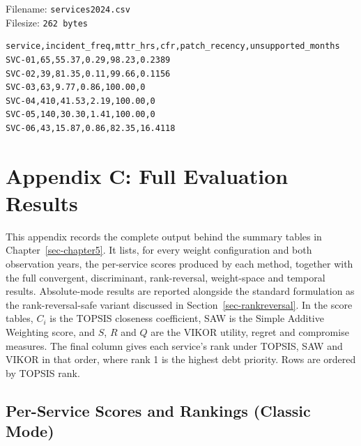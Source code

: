 \documentclass[
  12pt,
  letterpaper,
  12pt,
  oneside,
  english,
  onehalfspacing,
  headsepline]{MastersDoctoralThesis}
\begin{document}
\vspace{1cm}

Filename: \texttt{services2024.csv}\\
Filesize: \texttt{262\ bytes}

\begin{verbatim}
service,incident_freq,mttr_hrs,cfr,patch_recency,unsupported_months
SVC-01,65,55.37,0.29,98.23,0.2389
SVC-02,39,81.35,0.11,99.66,0.1156
SVC-03,63,9.77,0.86,100.00,0
SVC-04,410,41.53,2.19,100.00,0
SVC-05,140,30.30,1.41,100.00,0
SVC-06,43,15.87,0.86,82.35,16.4118
\end{verbatim}

\chapter{Appendix C: Full Evaluation Results}\label{sec-appendixc}

This appendix records the complete output behind the summary tables in
Chapter~\ref{sec-chapter5}. It lists, for every weight configuration and
both observation years, the per-service scores produced by each method,
together with the full convergent, discriminant, rank-reversal,
weight-space and temporal results. Absolute-mode results are reported
alongside the standard formulation as the rank-reversal-safe variant
discussed in Section~\ref{sec-rankreversal}. In the score tables,
\(C_i\) is the TOPSIS closeness coefficient, SAW is the Simple Additive
Weighting score, and \(S\), \(R\) and \(Q\) are the VIKOR utility,
regret and compromise measures. The final column gives each service's
rank under TOPSIS, SAW and VIKOR in that order, where rank 1 is the
highest debt priority. Rows are ordered by TOPSIS rank.

\section{Per-Service Scores and Rankings (Classic
Mode)}\label{per-service-scores-and-rankings-classic-mode}
\end{document}
